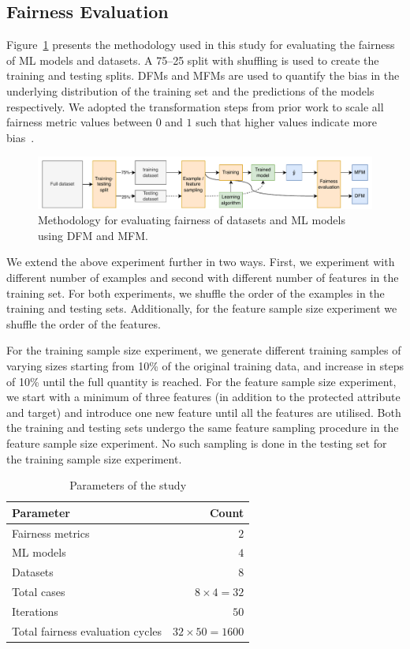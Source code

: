 \documentclass{article}
\begin{document}
\subsection{Fairness Evaluation}\label{sec:method-fair-eval}

Figure \ref{fig:method} presents the methodology used in this study
for evaluating the fairness of ML models and datasets. A 75--25 split
with shuffling is used to create the training and testing splits. DFMs
and MFMs are used to quantify the bias in the underlying distribution
of the training set and the predictions of the models respectively. We
adopted the transformation steps from prior work to scale all fairness
metric values between $0$ and $1$ such that higher values indicate
more bias \cite{zhang2021ignorance,hort2021fairea}.

\begin{figure}
  \centering
  \includegraphics[width=\linewidth]{method.pdf}
  \caption{Methodology for evaluating fairness of datasets and ML
  models using DFM and MFM.}
  \label{fig:method}
\end{figure}

We extend the above experiment further in two ways. First, we
experiment with different number of examples and second with different
number of features in the training set. For both experiments, we
shuffle the order of the examples in the training and testing
sets. Additionally, for the feature sample size experiment we shuffle
the order of the features.

For the training sample size experiment, we generate different
training samples of varying sizes starting from 10\% of the original
training data, and increase in steps of 10\% until the full quantity
is reached. For the feature sample size experiment, we start with
a minimum of three features (in addition to the protected attribute
and target) and introduce one new feature until all the features are
utilised. Both the training and testing sets undergo the same feature
sampling procedure in the feature sample size experiment. No such
sampling is done in the testing set for the training sample size
experiment.

\begin{table}
  \centering
  \begin{tabular}{l r}
    \toprule
    \textbf{Parameter} & \textbf{Count}\\
    \midrule
    Fairness metrics & $2$\\
    ML models & $4$\\
    Datasets & $8$\\
    Total cases & $8\times4=32$\\
    Iterations & $50$\\
    Total fairness evaluation cycles & $32\times50=1600$\\
    \bottomrule
  \end{tabular}
  \caption{Parameters of the study}
  \label{tab:parameters}
\end{table}
\end{document}
